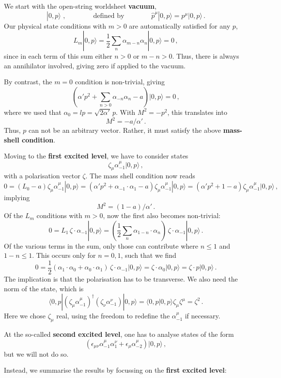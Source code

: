 \documentclass[12pt]{article}
\newcommand{\be}{\begin{equation}}
\newcommand{\ee}{\end{equation}}
\numberwithin{equation}{section}
\begin{document}
We start with the open-string worldsheet {\bf vacuum},
\be
|0,p\rangle\,\,,\qquad\qquad\mbox{defined by}\qquad\qquad
\hat{p}^\mu|0,p\rangle=p^\mu|0,p\rangle\,.
\ee
Our physical state conditions with $m>0$ are automatically satisfied for any $p$,
\be
L_m|0,p\rangle=\frac{1}{2}\sum_n\alpha_{m-n}\alpha_n|0,p\rangle=0\,,
\ee
since in each term of this sum either $n>0$ or $m-n>0$. Thus, there is always an annihilator involved, giving zero if applied to the vacuum.

By contrast, the $m=0$ condition is non-trivial, giving
\be
\left(\alpha' p^2+\sum_{n>0}\alpha_{-n}\alpha_n-a\right)|0,p\rangle=0\,,
\ee
where we used that $\alpha_0=lp=\sqrt{2\alpha'}\,p$. With $M^2=-p^2$, this translates into
\be
M^2=-a/\alpha'\,.
\ee
Thus, $p$ can not be an arbitrary vector. Rather, it must satisfy the above {\bf mass-shell condition}.

Moving to the {\bf first excited level}, we have to consider states
\be
\zeta_\mu\alpha^\mu_{-1}|0,p\rangle\,,
\ee
with a polarisation vector $\zeta$. The mass shell condition now reads
\be
0=(L_0-a)\zeta_\mu\alpha^\mu_{-1}|0,p\rangle = \left(\alpha' p^2 +\alpha_{-1}\cdot \alpha_1-a\right) \zeta_\mu\alpha^\mu_{-1}|0,p\rangle = \left(\alpha' p^2 +1-a\right)
\zeta_\mu\alpha^\mu_{-1}|0,p\rangle\,,
\ee
implying
\be
M^2=(1-a)/\alpha'\,.
\ee
Of the $L_m$ conditions with $m>0$, now the first also becomes non-trivial:
\be
0=L_1\,\zeta\cdot\alpha_{-1}|0,p\rangle=\left(\frac{1}{2}\sum_n\alpha_{1-n}\cdot\alpha_n\right)\,\zeta\cdot\alpha_{-1}|0,p\rangle\,.
\ee
Of the various terms in the sum, only those can contribute where $n\leq 1$ and $1-n\leq 1$. This occurs only for $n=0,1$, such that we find
\be
0=\frac{1}{2}(\alpha_1\cdot\alpha_0+\alpha_0\cdot\alpha_1)\,\zeta\cdot \alpha_{-1}|0,p\rangle=\zeta\cdot\alpha_0|0,p\rangle=\zeta\cdot p|0,p\rangle\,.
\ee
The implication is that the polarisation has to be transverse. We also need the norm of the state, which is
\be
\langle 0,p|(\zeta_\mu\alpha^\mu_{-1})^\dagger(\zeta_\nu\alpha^\nu_{-1})|0,p \rangle = \langle 0,p|0,p\rangle\zeta_\mu\zeta^\mu=\zeta^2\,.
\ee
Here we chose $\zeta_\mu$ real, using the freedom to redefine the $\alpha_{-1}^\mu$ if necessary.

At the so-called {\bf second excited level}, one has to analyse states of the form
\be
(\epsilon_{\mu\nu}\alpha_{-1}^\mu\alpha_{1}^\nu+\epsilon_\mu\alpha_{-2}^\mu) |0,p\rangle\,,
\ee
but we will not do so. 

Instead, we summarise the results by focussing on the {\bf first excited level}:
\end{document}
